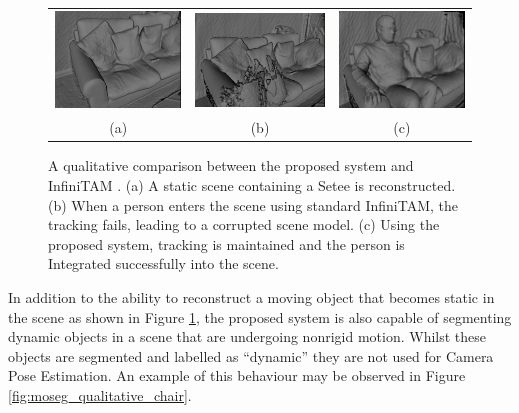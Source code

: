 \begin{figure}[ht]
  \label{fig:moseg_qualitative_setee}
  \centering
  \begin{tabular}{ccc}
    \includegraphics[height=.2\linewidth]{figures/moseg/original_sitting.png} &
    \includegraphics[height=.2\linewidth]{figures/moseg/infinitam_sitting.png} &
    \includegraphics[height=.2\linewidth]{figures/moseg/moseg_sitting.png}\\
    (a) & (b) & (c)
  \end{tabular}
  \caption{A qualitative comparison between the proposed system and InfiniTAM
    \cite{Prisacariu2014}.
    (a) A static scene containing a Setee is reconstructed.
    (b) When a person enters the scene using standard InfiniTAM, the tracking
    fails, leading to a corrupted scene model.
    (c) Using the proposed system, tracking is maintained and the person is
    Integrated successfully into the scene.}
\end{figure}

In addition to the ability to reconstruct a moving object that becomes static in
the scene as shown in Figure \ref{fig:moseg_qualitative_setee}, the proposed
system is also capable of segmenting dynamic objects in a scene that are
undergoing nonrigid motion. Whilst these objects are segmented and labelled as
``dynamic'' they are not used for Camera Pose Estimation. An example of this
behaviour may be observed in Figure \ref{fig:moseg_qualitative_chair}.

